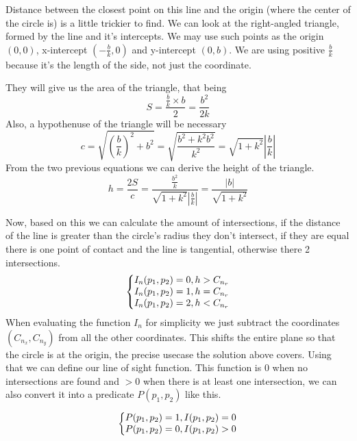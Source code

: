 \documentclass[12pt, titlepage]{article}
\begin{document}
Distance between the closest point on this line and the origin (where the center
of the circle is) is a little trickier to find. We can look at the right-angled triangle, formed
by the line and it's intercepts. We may use such points as the origin $(0, 0)$, 
x-intercept $(-\frac{b}{k}, 0)$ and y-intercept $(0, b)$. We are using positive
$\frac{b}{k}$ because it's the length of the side, not just the coordinate.

They will give us the area of the triangle, that being
\begin{equation}
    S = \frac{\frac{b}{k} \times b}{2}  = \frac{b^2}{2k}
\end{equation}
Also, a hypothenuse of the triangle will be necessary
\begin{equation}
    c = \sqrt{\left(\frac{b}{k}\right)^2 + b^2} = \sqrt{\frac{b^2 + k^2b^2}{k^2}} = \sqrt{1+k^2}\left|\frac{b}{k}\right|
\end{equation}
From the two previous equations we can derive the height of the triangle.
\begin{equation}
    h = \frac{2S}{c} = \frac{\frac{b^2}{k}}{\sqrt{1+k^2}\left|\frac{b}{k}\right|} = \frac{|b|}{\sqrt{1 + k^2}}
\end{equation}

Now, based on this we can calculate the amount of intersections, if the distance
of the line is greater than the circle's radius they don't intersect,
if they are equal there is one point of contact and the line is tangential,
otherwise there 2 intersections.
\begin{equation}
    \left\{\begin{array}{@{}l@{}}
       I_n(p_1, p_2) = 0, h > C_{n_r}\\
       I_n(p_1, p_2) = 1, h = C_{n_r}\\
       I_n(p_1, p_2) = 2, h < C_{n_r}
    \end{array}\right.
\end{equation}
When evaluating the function $I_n$ for simplicity we just subtract the 
coordinates $(C_{n_x}, C_{n_y})$ from all the other coordinates. This shifts 
the entire plane so that the circle is at the origin, the precise usecase the
solution above covers. Using that we can define our line of sight function.
This function is 0 when no intersections are found and $> 0$ when there is
at least one intersection, we can also convert it into a predicate $P(p_1, p_2)$ like this.

\begin{equation}
    \left\{\begin{array}{@{}l@{}}
       P(p_1, p_2) = 1, I(p_1, p_2) = 0\\
       P(p_1, p_2) = 0, I(p_1, p_2) > 0\\
    \end{array}\right.
\end{equation}
\end{document}
